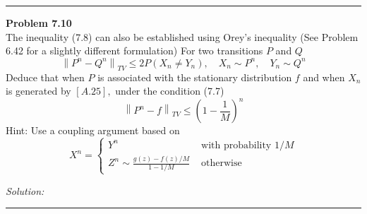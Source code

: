 \documentclass[a4paper, 11pt]{article}
\newenvironment{problem}[2][Problem]
    { \begin{mdframed}[backgroundcolor=gray!20] \textbf{#1 #2} \\}
    {  \end{mdframed}}
\newenvironment{solution}
    {\textit{Solution:}}
    {}
\begin{document}
\noindent\rule{7in}{2.8pt}
\begin{problem}{7.10}

The inequality (7.8) can also be established using Orey's inequality (See Problem 6.42 for a slightly different formulation) For two transitions $P$ and $Q$
\[
\left\|P^{n}-Q^{n}\right\|_{T V} \leq 2 P\left(X_{n} \neq Y_{n}\right), \quad X_{n} \sim P^{n}, \quad Y_{n} \sim Q^{n}
\]
Deduce that when $P$ is associated with the stationary distribution $f$ and when $X_{n}$ is generated by $[A .25],$ under the condition (7.7)
\[
\left\|P^{n}-f\right\|_{T V} \leq\left(1-\frac{1}{M}\right)^{n}
\]
Hint: Use a coupling argument based on
\[
X^{n}=\left\{\begin{array}{ll}
Y^{n} & \text { with probability } 1 / M \\
Z^{n} \sim \frac{g(z)-f(z) / M}{1-1 / M} & \text { otherwise }
\end{array}\right.
\]
\end{problem}
\begin{solution}

\end{solution}

\noindent\rule{7in}{2.8pt}
\end{document}
